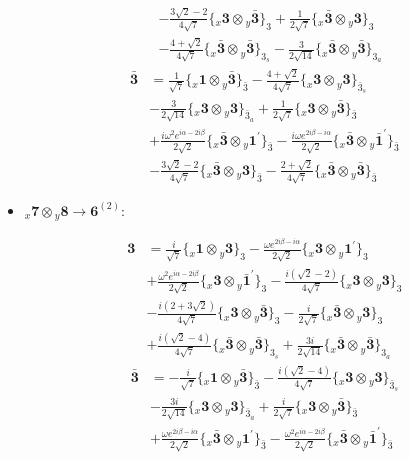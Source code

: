 \documentclass[english]{article}
\newcommand{\rep}[1]{\mathbf{#1}}
\newcommand{\repx}[2]{{}_{#2}\mathbf{#1}}
\newcommand{\tsprodx}[2]{\repx{#1}{x}\otimes\repx{#2}{y}}
\newcommand{\subcgt}[3]{\big\{ \tsprodx{#1}{#2}\big\}^{}_{#3}}
\begin{document}
\begin{itemize}
\begin{fleqn}
\begin{align*}
 & -\frac{3 \sqrt{2}-2}{4 \sqrt{7}}\subcgt{3}{\bar{3}}{3}+\frac{1}{2 \sqrt{7}}\subcgt{\bar{3}}{3}{3} \\ 
 & -\frac{4+\sqrt{2}}{4 \sqrt{7}}\subcgt{\bar{3}}{\bar{3}}{3_{s}}-\frac{3}{2 \sqrt{14}}\subcgt{\bar{3}}{\bar{3}}{3_{a}}
\end{align*}
\begin{align*}
\rep{\bar{3}} & = \frac{1}{\sqrt{7}}\subcgt{1}{\bar{3}}{\bar{3}}-\frac{4+\sqrt{2}}{4 \sqrt{7}}\subcgt{3}{3}{\bar{3}_{s}} \\ 
 & -\frac{3}{2 \sqrt{14}}\subcgt{3}{3}{\bar{3}_{a}}+\frac{1}{2 \sqrt{7}}\subcgt{3}{\bar{3}}{\bar{3}} \\ 
 & +\frac{i \omega ^2 e^{i \alpha -2 i \beta }}{2 \sqrt{2}}\subcgt{\bar{3}}{1^{\prime}}{\bar{3}}-\frac{i \omega  e^{2 i \beta -i \alpha }}{2 \sqrt{2}}\subcgt{\bar{3}}{\bar{1}^{\prime}}{\bar{3}} \\ 
 & -\frac{3 \sqrt{2}-2}{4 \sqrt{7}}\subcgt{\bar{3}}{3}{\bar{3}}-\frac{2+\sqrt{2}}{4 \sqrt{7}}\subcgt{\bar{3}}{\bar{3}}{\bar{3}}
\end{align*}
\end{fleqn}
\item $\tsprodx{7}{8}\to\rep{6}^{(2)}$:
\begin{fleqn}
\begin{align*}
\rep{3} & = \frac{i}{\sqrt{7}}\subcgt{1}{3}{3}-\frac{\omega  e^{2 i \beta -i \alpha }}{2 \sqrt{2}}\subcgt{3}{1^{\prime}}{3} \\ 
 & +\frac{\omega ^2 e^{i \alpha -2 i \beta }}{2 \sqrt{2}}\subcgt{3}{\bar{1}^{\prime}}{3}-\frac{i \left(\sqrt{2}-2\right)}{4 \sqrt{7}}\subcgt{3}{3}{3} \\ 
 & -\frac{i \left(2+3 \sqrt{2}\right)}{4 \sqrt{7}}\subcgt{3}{\bar{3}}{3}-\frac{i}{2 \sqrt{7}}\subcgt{\bar{3}}{3}{3} \\ 
 & +\frac{i \left(\sqrt{2}-4\right)}{4 \sqrt{7}}\subcgt{\bar{3}}{\bar{3}}{3_{s}}+\frac{3 i}{2 \sqrt{14}}\subcgt{\bar{3}}{\bar{3}}{3_{a}}
\end{align*}
\begin{align*}
\rep{\bar{3}} & = -\frac{i}{\sqrt{7}}\subcgt{1}{\bar{3}}{\bar{3}}-\frac{i \left(\sqrt{2}-4\right)}{4 \sqrt{7}}\subcgt{3}{3}{\bar{3}_{s}} \\ 
 & -\frac{3 i}{2 \sqrt{14}}\subcgt{3}{3}{\bar{3}_{a}}+\frac{i}{2 \sqrt{7}}\subcgt{3}{\bar{3}}{\bar{3}} \\ 
 & +\frac{\omega  e^{2 i \beta -i \alpha }}{2 \sqrt{2}}\subcgt{\bar{3}}{1^{\prime}}{\bar{3}}-\frac{\omega ^2 e^{i \alpha -2 i \beta }}{2 \sqrt{2}}\subcgt{\bar{3}}{\bar{1}^{\prime}}{\bar{3}} \\ 

\end{align*}
\end{fleqn}
\end{itemize}
\end{document}
